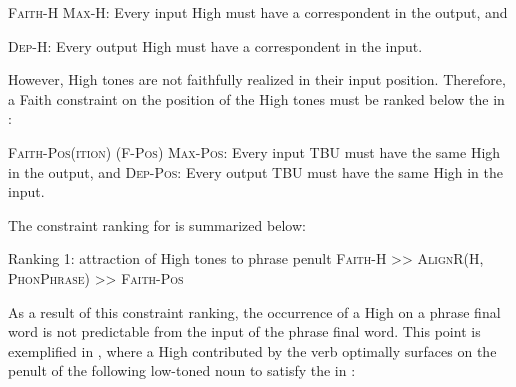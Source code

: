 \documentclass[output=paper,newtxmath,modfonts,nonflat,hidelinks]{langsci/langscibook}
\begin{document}
\ea\label{ex:downing:15}\textsc{Faith-H}
\ea\label{ex:downing:15a} \textsc{Max-H}: Every input High  must have a correspondent in the output, and

\ex\label{ex:downing:15b}\textsc{Dep-H}: Every output High  must have a correspondent in the input.
\z
\z

However, High tones are not faithfully realized in their input position. Therefore, a Faith constraint on the position of the High tones must be ranked below the  in :

\ea\label{ex:downing:16}  \textsc{Faith-Pos(ition) (F-Pos)}
\sn
\ea\label{ex:downing:16a} \textsc{Max-Pos}: Every input TBU must have the same High  in the output, and
\ex\label{ex:downing:16b}\textsc{Dep-Pos}: Every output TBU must have the same High  in the input.
\z
\z

The constraint ranking for  is summarized below:


\ea\label{ex:downing:17}  Ranking 1:  attraction of High tones to phrase penult
\sn
\textsc{Faith-H >> AlignR(H, PhonPhrase}) \textsc{>> Faith-Pos}
\z


As a result of this constraint ranking, the occurrence of a High  on a phrase final word is not predictable from the input  of the phrase final word. This point is exemplified in , where a High  contributed by the verb optimally surfaces on the penult of the following low-toned noun to satisfy the  in :

\end{document}
